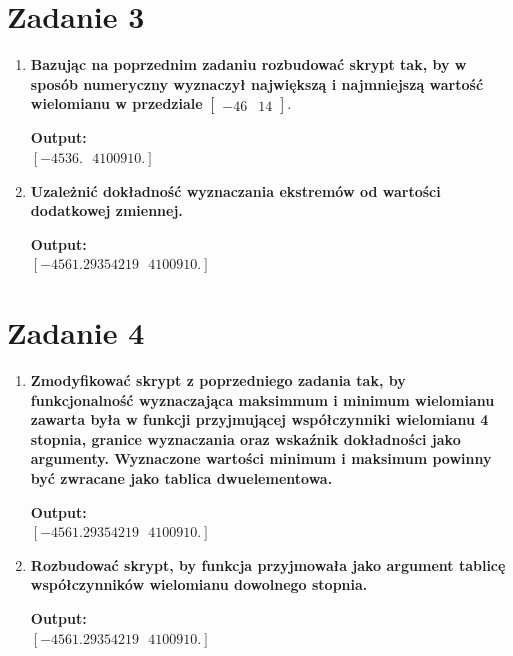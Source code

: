 \documentclass[12pt]{article}
\newenvironment{shbox}
{\begin{tcolorbox}[enhanced, boxrule=0pt, drop fuzzy shadow southeast]}
{\end{tcolorbox}}
\begin{document}
    \section{Zadanie 3}
        \begin{enumerate}
            \item\textbf{Bazując na poprzednim zadaniu rozbudować skrypt tak, by w sposób numeryczny wyznaczył
            największą i najmniejszą wartość wielomianu w przedziale} $
                \begin{bmatrix}
                    -46&14
                \end{bmatrix}$.
                \begin{shbox}
                    \textbf{Output:} \\
                    $[ -4536.\text{ } 4100910.]$
                \end{shbox}

            \item\textbf{Uzależnić dokładność wyznaczania ekstremów od wartości dodatkowej zmiennej.}
                \begin{shbox}
                    \textbf{Output:} \\
                    $[ -4561.29354219\text{ } 4100910.]$
                \end{shbox}
        \end{enumerate}
        
    \section{Zadanie 4}
    \begin{enumerate}
            \item\textbf{Zmodyfikować skrypt z poprzedniego zadania tak,
                by funkcjonalność wyznaczająca maksimmum i minimum wielomianu
                zawarta była w funkcji przyjmującej współczynniki wielomianu 4 stopnia,
                granice wyznaczania oraz wskaźnik dokładności jako argumenty.
                Wyznaczone wartości minimum i maksimum powinny być zwracane jako tablica dwuelementowa.}
                \begin{shbox}
                    \textbf{Output:} \\
                    $[ -4561.29354219\text{ } 4100910.]$
                \end{shbox}

            \item\textbf{Rozbudować skrypt, by funkcja przyjmowała jako argument
                tablicę współczynników wielomianu dowolnego stopnia.}
                \begin{shbox}
                    \textbf{Output:} \\
                    $[ -4561.29354219\text{ } 4100910.]$
                \end{shbox}
        \end{enumerate}
        
\end{document}
